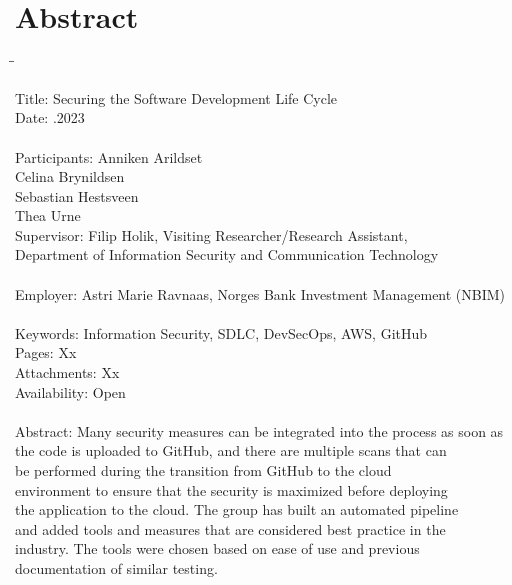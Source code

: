 \chapter*{Abstract}
\lipsum[1]
\begin{tabbing}
\hspace{2cm}\=\hspace{3cm}\=\kill %

Title: \> \>Securing the Software Development Life Cycle \\
Date: \> .2023 \\ 
\\
Participants: \> \> Anniken Arildset \\ \> \> Celina Brynildsen \\ \> \> Sebastian Hestsveen \\ \> \> Thea Urne \\

Supervisor: \> \> Filip Holik, Visiting Researcher/Research Assistant, \\\> \> Department of Information Security and Communication Technology \\
\\
Employer: \> \>  Astri Marie Ravnaas, Norges Bank Investment Management (NBIM) \\
\\
Keywords: \> \> Information Security, SDLC, DevSecOps, AWS, GitHub \\
Pages: \> \> Xx \\
Attachments: \> \> Xx \\
Availability: \> \> Open \\
\\
Abstract: \> \> Many security measures can be integrated into the process as soon as\\ \> \> the  code is uploaded to GitHub, and there are multiple scans that can\\ \> \> be performed during the transition from GitHub to the cloud\\ \> \> environment to ensure that the security is maximized before deploying\\ \> \>  the application to the cloud. The group has built an automated pipeline \\ \> \>and added tools and measures that are considered best practice in the\\ \> \> industry. The tools were chosen based on ease of use and previous \\ \> \>documentation of similar testing. 


\end{tabbing}
